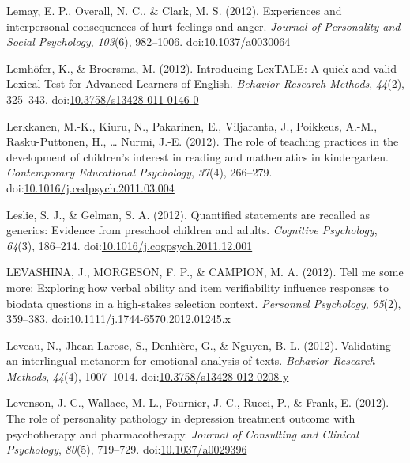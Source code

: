 \documentclass[english,man]{apa6}
\begin{document}
\hypertarget{ref-Lemay2012}{}
Lemay, E. P., Overall, N. C., \& Clark, M. S. (2012). Experiences and
interpersonal consequences of hurt feelings and anger. \emph{Journal of
Personality and Social Psychology}, \emph{103}(6), 982--1006.
doi:\href{https://doi.org/10.1037/a0030064}{10.1037/a0030064}

\hypertarget{ref-Lemhofer2012}{}
Lemhöfer, K., \& Broersma, M. (2012). Introducing LexTALE: A quick and
valid Lexical Test for Advanced Learners of English. \emph{Behavior
Research Methods}, \emph{44}(2), 325--343.
doi:\href{https://doi.org/10.3758/s13428-011-0146-0}{10.3758/s13428-011-0146-0}

\hypertarget{ref-Lerkkanen2012}{}
Lerkkanen, M.-K., Kiuru, N., Pakarinen, E., Viljaranta, J., Poikkeus,
A.-M., Rasku-Puttonen, H., \ldots{} Nurmi, J.-E. (2012). The role of
teaching practices in the development of children's interest in reading
and mathematics in kindergarten. \emph{Contemporary Educational
Psychology}, \emph{37}(4), 266--279.
doi:\href{https://doi.org/10.1016/j.cedpsych.2011.03.004}{10.1016/j.cedpsych.2011.03.004}

\hypertarget{ref-Leslie2012}{}
Leslie, S. J., \& Gelman, S. A. (2012). Quantified statements are
recalled as generics: Evidence from preschool children and adults.
\emph{Cognitive Psychology}, \emph{64}(3), 186--214.
doi:\href{https://doi.org/10.1016/j.cogpsych.2011.12.001}{10.1016/j.cogpsych.2011.12.001}

\hypertarget{ref-Levashina2012}{}
LEVASHINA, J., MORGESON, F. P., \& CAMPION, M. A. (2012). Tell me some
more: Exploring how verbal ability and item verifiability influence
responses to biodata questions in a high-stakes selection context.
\emph{Personnel Psychology}, \emph{65}(2), 359--383.
doi:\href{https://doi.org/10.1111/j.1744-6570.2012.01245.x}{10.1111/j.1744-6570.2012.01245.x}

\hypertarget{ref-Leveau2012}{}
Leveau, N., Jhean-Larose, S., Denhière, G., \& Nguyen, B.-L. (2012).
Validating an interlingual metanorm for emotional analysis of texts.
\emph{Behavior Research Methods}, \emph{44}(4), 1007--1014.
doi:\href{https://doi.org/10.3758/s13428-012-0208-y}{10.3758/s13428-012-0208-y}

\hypertarget{ref-Levenson2012}{}
Levenson, J. C., Wallace, M. L., Fournier, J. C., Rucci, P., \& Frank,
E. (2012). The role of personality pathology in depression treatment
outcome with psychotherapy and pharmacotherapy. \emph{Journal of
Consulting and Clinical Psychology}, \emph{80}(5), 719--729.
doi:\href{https://doi.org/10.1037/a0029396}{10.1037/a0029396}
\end{document}
